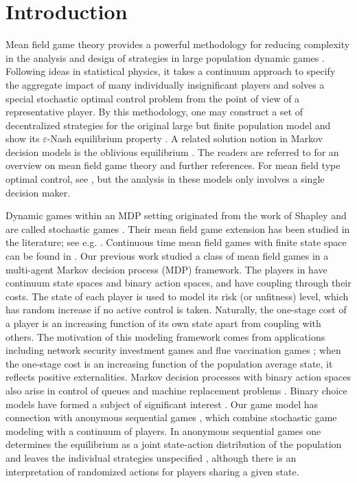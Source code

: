 \documentclass[graybox]{svmult}
\begin{document}
\section{Introduction}


Mean field game theory provides a powerful methodology for reducing complexity in the analysis and design of strategies in large population dynamic games \cite{HCM03,HMC06,LL07}.
Following ideas in statistical physics, it takes a continuum approach to specify the aggregate impact of many individually insignificant players and solves a special stochastic optimal control problem from the point of view of a representative player.
  By this methodology, one may
construct a set of decentralized strategies
for the original large but finite population model and show its $\varepsilon$-Nash equilibrium property \cite{HCM03,HCM07,HMC06}.
 A related solution notion in Markov decision models is the oblivious equilibrium \cite{WBR08}.
  The readers are referred to \cite{BFY13,C14,CHM17,C12,CD18} for an overview on mean field game theory and further references. For mean field type optimal control, see
\cite{BFY13,Y11}, but the analysis in these models only involves a single decision maker.





Dynamic games within an MDP setting originated from the work of  Shapley  and are called stochastic games \cite{FV97,S53}. Their mean field game extension has been studied in the literature; see e.g. \cite{AJW15,B15,STR18,WBR08}.
Continuous time mean field games with finite state space can be found in \cite{GMS10,K12}.
Our previous work \cite{HM16Chen,HM17}
studied a class of mean field games in a multi-agent Markov decision process (MDP) framework.  The players in \cite{HM16Chen}  have continuum state spaces and binary action spaces, and have  coupling through their costs. The state of each player is used to model its risk (or unfitness) level, which has random increase if no active control is taken.  Naturally, the one-stage cost of a player is an increasing function of its own state apart from coupling with others. The motivation of this modeling framework comes from  applications including network security investment games and flue vaccination games \cite{JAW11,LB08,MP10};
when the one-stage cost is  an increasing function of the population average state, it reflects positive externalities. Markov decision processes with binary action spaces also arise in control of queues
and machine replacement problems \cite{AS95,BR11}. Binary choice models have formed a subject of
significant interest \cite{B13,BD01,S73,S95,WWA11}.
Our game model has connection with anonymous sequential games
\cite{JR88}, which combine stochastic game modeling with a continuum of players.
In anonymous sequential games one determines the equilibrium as a joint state-action distribution of the  population and  leaves the individual
strategies unspecified \cite[Sec. 4]{JR88}, although there is an interpretation of randomized actions for players sharing a given state.
\end{document}
